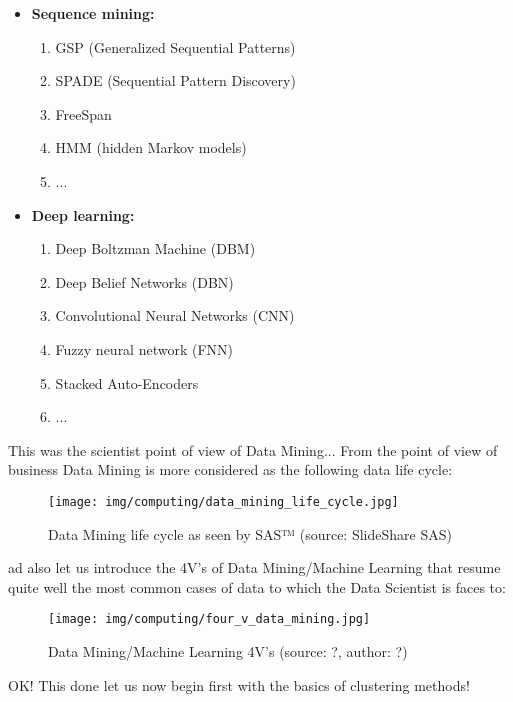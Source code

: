 \begin{itemize}
\begin{enumerate}
		\end{enumerate}
		\item \textbf{Sequence mining:}
		\begin{enumerate}
			\item GSP (Generalized Sequential Patterns)
			\item SPADE (Sequential Pattern Discovery)
			\item FreeSpan
			\item HMM (hidden Markov models)
			\item ...
		\end{enumerate}
		\item \textbf{Deep learning:}
		\begin{enumerate}
			\item Deep Boltzman Machine (DBM)
			\item Deep Belief Networks (DBN)
			\item Convolutional Neural Networks (CNN)
			\item Fuzzy neural network (FNN)
			\item Stacked Auto-Encoders
			\item ...
		\end{enumerate}
	\end{itemize}
	This was the scientist point of view of Data Mining... From the point of view of business Data Mining is more considered as the following data life cycle:
	\begin{figure}[H]
		\centering
		\texttt{[image: img/computing/data\_mining\_life\_cycle.jpg]}
		\caption{Data Mining life cycle as seen by SAS™ (source: SlideShare SAS)}
	\end{figure}
	ad also let us introduce the 4V's of Data Mining/Machine Learning that resume quite well the most common cases of data to which the Data Scientist is faces to:
	\begin{figure}[H]
		\centering
		\texttt{[image: img/computing/four\_v\_data\_mining.jpg]}
		\caption{Data Mining/Machine Learning 4V's (source: ?, author: ?)}
	\end{figure}
	OK! This done let us now begin first with the basics of clustering methods! 
